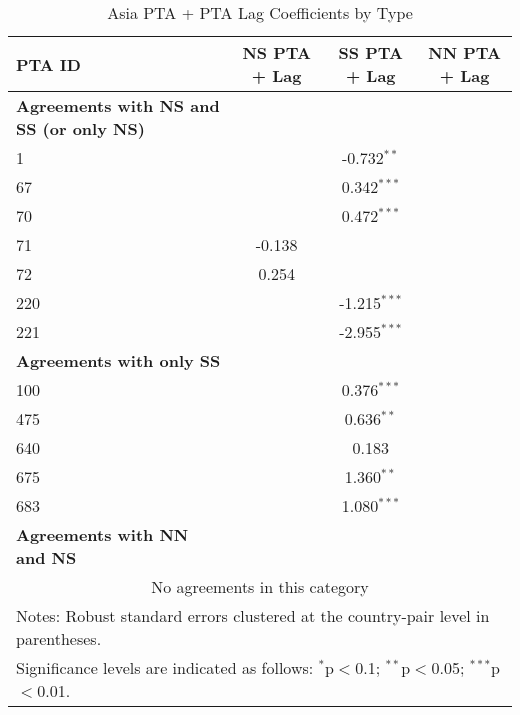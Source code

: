 \begin{table}[htbp]
    \centering
    \caption{Asia PTA + PTA Lag Coefficients by Type}
    \label{tab:asia_pta}
    \begin{adjustbox}{max width=\textwidth}
    \begin{tabular}{lccc}
    \hline
    \textbf{PTA ID} & \textbf{NS PTA + Lag} & \textbf{SS PTA + Lag} & \textbf{NN PTA + Lag} \\
    \hline
    \textbf{Agreements with NS and SS (or only NS)} &  &  &  \\
    \hline
    1 &  & -0.732$^{\ast\ast}$ &  \\
    67 &  & 0.342$^{\ast\ast\ast}$ &  \\
    70 &  & 0.472$^{\ast\ast\ast}$ &  \\
    71 & -0.138 &  &  \\
    72 & 0.254 &  &  \\
    220 &  & -1.215$^{\ast\ast\ast}$ &  \\
    221 &  & -2.955$^{\ast\ast\ast}$ &  \\
    \hline
    \textbf{Agreements with only SS} &  &  &  \\
    \hline
    100 &  & 0.376$^{\ast\ast\ast}$ &  \\
    475 &  & 0.636$^{\ast\ast}$ &  \\
    640 &  & 0.183 &  \\
    675 &  & 1.360$^{\ast\ast}$ &  \\
    683 &  & 1.080$^{\ast\ast\ast}$ &  \\
    \hline
    \textbf{Agreements with NN and NS} &  &  &  \\
    \hline
    \multicolumn{4}{c}{No agreements in this category} \\
    \hline
    \multicolumn{4}{l}{\footnotesize{Notes: Robust standard errors clustered at the country-pair level in parentheses.}} \\
    \multicolumn{4}{l}{\footnotesize{Significance levels are indicated as follows: $^{\ast}$p$<$0.1; $^{\ast\ast}$p$<$0.05; $^{\ast\ast\ast}$p$<$0.01.}} \\
    \end{tabular}
    \end{adjustbox}
\end{table}
